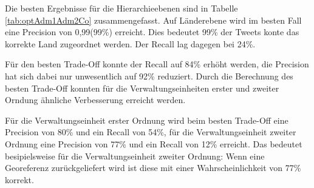 			Die besten Ergebnisse für die Hierarchieebenen sind in Tabelle \ref{tab:optAdm1Adm2Co} zusammengefasst.
			Auf Länderebene wird im besten Fall eine Precision von 0,99(99\%) erreicht.
			Dies bedeutet 99\% der Tweets konte das korrekte Land zugeordnet werden.
			Der Recall lag dagegen bei 24\%.

			Für den besten Trade-Off konnte der Recall auf 84\% erhöht werden, die Precision hat sich dabei nur unwesentlich auf 92\% reduziert. 
			Durch die Berechnung des besten Trade-Off konnten für die Verwaltungseinheiten erster und zweiter Orndung ähnliche Verbesserung erreicht werden.

			Für die Verwaltungseinheit erster Ordnung wird beim besten Trade-Off eine Precision von 80\% und ein Recall von 54\%, für die Verwaltungseinheit zweiter Ordnung eine Precision von 77\% und ein Recall von 12\% erreicht. 
			Das bedeutet besipielsweise für die Verwaltungseinheit zweiter Ordnung: Wenn eine Georeferenz zurückgeliefert wird ist diese mit einer Wahrscheinlichkeit von 77\% korrekt. 

